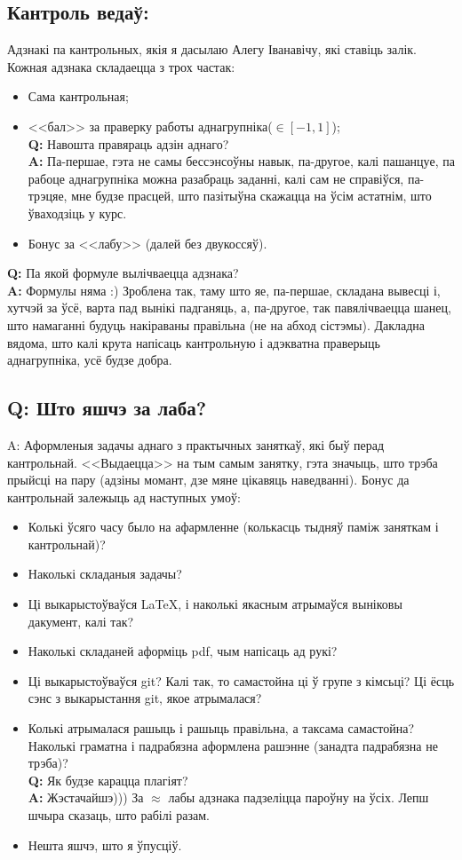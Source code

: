 \documentclass[12pt, a4paper]{extarticle}
\newcommand{\formQA}[2]{%
	\textbf{Q:} #1 \\
	\textbf{A:} #2
}
\begin{document}
	\subsection{Кантроль ведаў:}
	Адзнакі па кантрольных, якія я дасылаю Алегу Іванавічу, які ставіць залік. Кожная адзнака складаецца з трох частак: 
	\begin{itemize}
		\item Сама кантрольная;
		\item <<бал>> за праверку работы аднагрупніка($\in [-1, 1]$); \\[6pt]
		\formQA{Навошта правяраць адзін аднаго?}
		{Па-першае, гэта не самы бессэнсоўны навык, па-другое, калі пашанцуе, па рабоце аднагрупніка можна разабраць заданні, калі сам не справіўся, па-трэцяе, мне будзе прасцей, што пазітыўна скажацца на ўсім астатнім, што ўваходзіць у курс.}
		\item Бонус за <<лабу>> (далей без двукоссяў).
	\end{itemize}
	\formQA{Па якой формуле вылічваецца адзнака?}
	{Формулы няма :) Зроблена так, таму што яе, па-першае, складана вывесці і, хутчэй за ўсё, варта пад вынікі падганяць, а, па-другое, так павялічваецца шанец, што намаганні будуць накіраваны правільна (не на абход сістэмы). Дакладна вядома, што калі крута напісаць кантрольную і адэкватна праверыць аднагрупніка, усё будзе добра.}
	\subsection{Q: Што яшчэ за лаба?}
	{\large A:} Аформленыя задачы аднаго з практычных заняткаў, які быў перад кантрольнай. <<Выдаецца>> на тым самым занятку, гэта значыць, што трэба прыйсці на пару (адзіны момант, дзе мяне цікавяць наведванні). Бонус да кантрольнай залежыць ад наступных умоў:
	\begin{itemize}
		\item Колькі ўсяго часу было на афармленне (колькасць тыдняў паміж заняткам і кантрольнай)?
		\item Наколькі складаныя задачы?
		\item Ці выкарыстоўваўся \LaTeX, і наколькі якасным атрымаўся выніковы дакумент, калі так?
		\item Наколькі складаней аформіць pdf, чым напісаць ад рукі?
		\item Ці выкарыстоўваўся git? Калі так, то самастойна ці ў групе з кімсьці? Ці ёсць сэнс з выкарыстання git, якое атрымалася?
		\item Колькі атрымалася рашыць і рашыць правільна, а таксама самастойна? Наколькі граматна і падрабязна аформлена рашэнне (занадта падрабязна не трэба)? \\[6pt]
		\formQA{Як будзе карацца плагіят?}
		{Жэстачайшэ))) За $\approx$ лабы адзнака падзеліцца пароўну на ўсіх. Лепш шчыра сказаць, што рабілі разам.}
		\item Нешта яшчэ, што я ўпусціў.
	\end{itemize}
\end{document}
